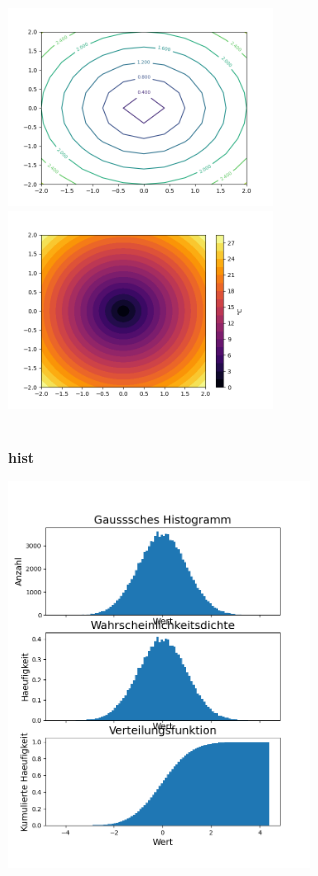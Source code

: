 \begin{minipage}[h]{8cm}
	\includegraphics[width=7cm,align=t]{pics/Matplotlib/Contour.png}
	\includegraphics[width=7cm,align=t]{pics/Matplotlib/Contourf.png}
\end{minipage}
\\[0.5cm]
\textbf{hist}
\\[0.1cm]
\begin{minipage}[h]{10cm}
	
\end{minipage}
\begin{minipage}[h]{8cm}
	\includegraphics[width=8cm,align=t]{pics/Matplotlib/Hist.png}
\end{minipage}
